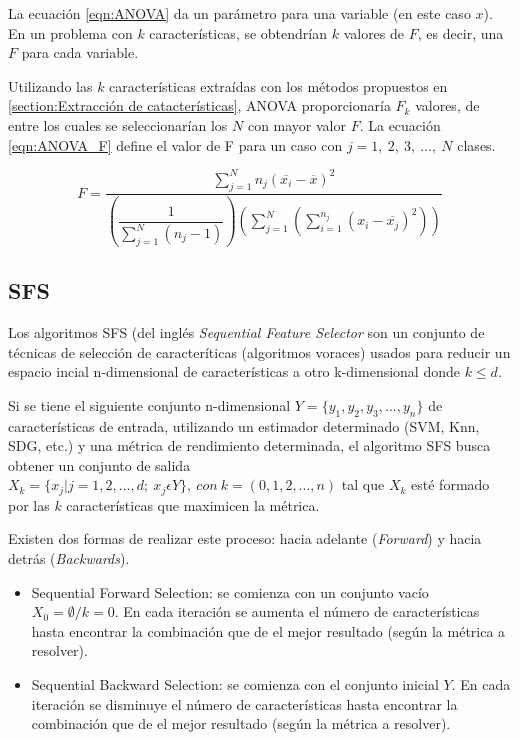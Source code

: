 La ecuación \ref{eqn:ANOVA} da un parámetro para una variable (en este caso $x$). En un problema con $k$ características, se obtendrían $k$ valores de $F$, es decir, una $F$ para cada variable.

Utilizando las $k$ características extraídas con los métodos propuestos en \ref{section:Extracción de catacterísticas}, ANOVA proporcionaría $F_{k}$ valores, de entre los cuales se seleccionarían los $N$ con mayor valor $F$. La ecuación \ref{eqn:ANOVA_F} define el valor de F para un caso con $j = 1,\:2,\:3,\:...,\:N$ clases. 

\begin{equation}
	F = \dfrac{\sum_{j=1}^{N} n_{j}\left(\overline{x_{i}}-\overline{x}\right)^{2}}{\left(\dfrac{1}{\sum_{j=1}^{N}(n_{j}-1)}\right) \left(\sum_{j=1}^{N}\left(\sum_{i=1}^{n_{j}}(x_{i}-\overline{x_{j}})^{2}\right)\right)}
	\label{eqn:ANOVA_F}
\end{equation}


\subsection{SFS}

Los algoritmos SFS (del inglés \textit{Sequential Feature Selector} son un conjunto de técnicas de selección de caracteríticas (algoritmos voraces) usados para reducir un espacio incial n-dimensional de características a otro k-dimensional donde $k\leq d$.

Si se tiene el siguiente conjunto n-dimensional $Y = \{y_{1},y_{2},y_{3},...,y_{n}\}$ de características de entrada, utilizando un estimador determinado (SVM, Knn, SDG, etc.) y una métrica de rendimiento determinada, el algoritmo SFS busca obtener un conjunto de salida $X_{k} = \{x_{j} | j = 1,2,...,d;\: x_{j}\epsilon Y\},\: con \:k = (0,1,2,...,n)$ tal que $X_{k}$ esté formado por las $k$ características que maximicen la métrica.

Existen dos formas de realizar este proceso: hacia adelante (\textit{Forward}) y hacia detrás (\textit{Backwards}).

\begin{itemize}
	\item Sequential Forward Selection: se comienza con un conjunto vacío $X_{0} = \emptyset / k = 0$. En cada iteración se aumenta el número de características hasta encontrar la combinación que de el mejor resultado (según la métrica a resolver).
	\item Sequential Backward Selection: se comienza con el conjunto inicial $Y$. En cada iteración se disminuye el número de características hasta encontrar la combinación que de el mejor resultado (según la métrica a resolver).
\end{itemize}

